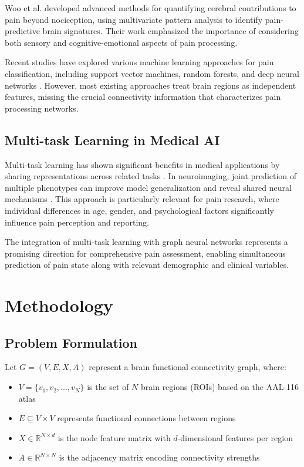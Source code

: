 \documentclass[10pt,journal,compsoc]{IEEEtran}
\begin{document}
Woo et al. \cite{woo2017quantifying} developed advanced methods for quantifying cerebral contributions to pain beyond nociception, using multivariate pattern analysis to identify pain-predictive brain signatures. Their work emphasized the importance of considering both sensory and cognitive-emotional aspects of pain processing.

Recent studies have explored various machine learning approaches for pain classification, including support vector machines, random forests, and deep neural networks \cite{zhang2022deep,kim2023graph}. However, most existing approaches treat brain regions as independent features, missing the crucial connectivity information that characterizes pain processing networks.

\subsection{Multi-task Learning in Medical AI}

Multi-task learning has shown significant benefits in medical applications by sharing representations across related tasks \cite{caruana1997multitask}. In neuroimaging, joint prediction of multiple phenotypes can improve model generalization and reveal shared neural mechanisms \cite{ruder2017overview}. This approach is particularly relevant for pain research, where individual differences in age, gender, and psychological factors significantly influence pain perception and reporting.

The integration of multi-task learning with graph neural networks represents a promising direction for comprehensive pain assessment, enabling simultaneous prediction of pain state along with relevant demographic and clinical variables.

\section{Methodology}

\subsection{Problem Formulation}

Let $G = (V, E, X, A)$ represent a brain functional connectivity graph, where:
\begin{itemize}
\item $V = \{v_1, v_2, ..., v_N\}$ is the set of $N$ brain regions (ROIs) based on the AAL-116 atlas \cite{tzourio2002automated}
\item $E \subseteq V \times V$ represents functional connections between regions
\item $X \in \mathbb{R}^{N \times d}$ is the node feature matrix with $d$-dimensional features per region
\item $A \in \mathbb{R}^{N \times N}$ is the adjacency matrix encoding connectivity strengths
\end{itemize}
\end{document}

